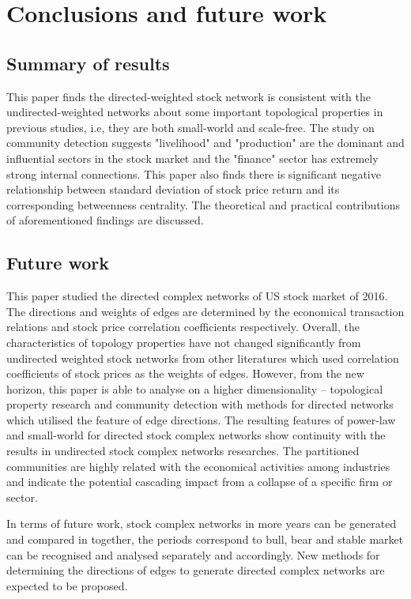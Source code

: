 \chapter[Conclusions]{Conclusions and future work}
\label{cpt:conclude}
\section{Summary of results}
This paper finds the directed-weighted stock network is consistent with the undirected-weighted networks about some important topological properties in previous studies, i.e, they are both small-world and scale-free. The study on community detection suggests "livelihood" and "production" are the dominant and influential sectors in the stock market and the "finance" sector has extremely strong internal connections. This paper also finds there is significant negative relationship between standard deviation of stock price return and its corresponding betweenness centrality. The theoretical and practical contributions of aforementioned findings are discussed.

\section{Future work}

This paper studied the directed complex networks of US stock market of 2016. The directions and weights of edges are determined by the economical transaction relations and stock price correlation coefficients respectively. Overall, the characteristics of topology properties have not changed significantly from undirected weighted stock networks from other literatures which used correlation coefficients of stock prices as the weights of edges. However, from the new horizon, this paper is able to analyse on a higher dimensionality -- topological property research and community detection with methods for directed networks which utilised the feature of edge directions. The resulting features of power-law and small-world for directed stock complex networks show continuity with the results in undirected stock complex networks researches. The partitioned communities are highly related with the economical activities among industries and indicate the potential cascading impact from a collapse of a specific firm or sector.

In terms of future work, stock complex networks in more years can be generated and compared in together, the periods correspond to bull, bear and stable market can be recognised and analysed separately and accordingly. New methods for determining the directions of edges to generate directed complex networks are expected to be proposed.
